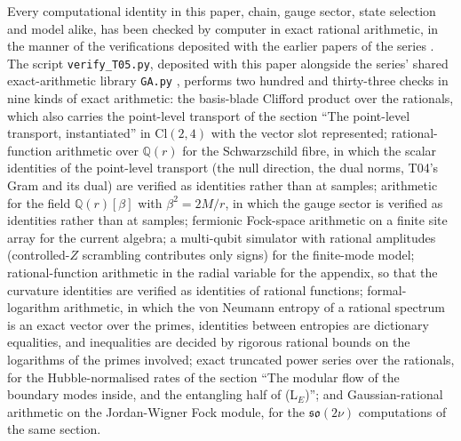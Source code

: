 \documentclass[11pt]{article}
\theoremstyle{definition}
\theoremstyle{plain}
\providecommand{\Cl}{}\renewcommand{\Cl}{\mathrm{Cl}}
\begin{document}
\label{c:note.singularity.setting-machine-verification}
Every computational identity in this paper, chain, gauge sector, state selection and model alike, has been checked by computer in exact rational arithmetic, in the manner of the verifications deposited with the earlier papers of the series \cite{ButlerT1, ButlerT3, ButlerT4}. The script \texttt{verify\_T05.py}, deposited with this paper alongside the series' shared exact-arithmetic library \texttt{GA.py} \cite{ButlerVerifyT05}, performs two hundred and thirty-three checks in nine kinds of exact arithmetic: the basis-blade Clifford product over the rationals, which also carries the point-level transport of the section ``The point-level transport, instantiated'' in $\Cl(2,4)$ with the vector slot represented; rational-function arithmetic over $\mathbb{Q}(r)$ for the Schwarzschild fibre, in which the scalar identities of the point-level transport (the null direction, the dual norms, T04's Gram and its dual) are verified as identities rather than at samples; arithmetic for the field $\mathbb{Q}(r)[\beta]$ with $\beta^2 = 2M/r$, in which the gauge sector is verified as identities rather than at samples; fermionic Fock-space arithmetic on a finite site array for the current algebra; a multi-qubit simulator with rational amplitudes (controlled-$Z$ scrambling contributes only signs) for the finite-mode model; rational-function arithmetic in the radial variable for the appendix, so that the curvature identities are verified as identities of rational functions; formal-logarithm arithmetic, in which the von Neumann entropy of a rational spectrum is an exact vector over the primes, identities between entropies are dictionary equalities, and inequalities are decided by rigorous rational bounds on the logarithms of the primes involved; exact truncated power series over the rationals, for the Hubble-normalised rates of the section ``The modular flow of the boundary modes inside, and the entangling half of (L$_E$)''; and Gaussian-rational arithmetic on the Jordan-Wigner Fock module, for the $\mathfrak{so}(2\nu)$ computations of the same section.
\end{document}
